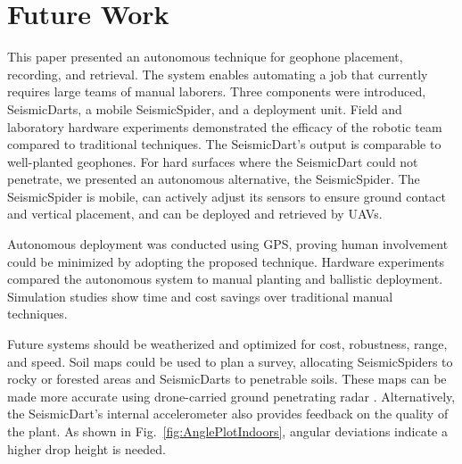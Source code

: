 \section[Conclusion]{Future Work}
This paper presented an autonomous technique for geophone placement, recording, and retrieval. The system enables automating a job that currently requires large teams of manual laborers. Three components were introduced, SeismicDarts, a mobile SeismicSpider, and a deployment unit.
Field and laboratory hardware experiments demonstrated the efficacy of the robotic team compared to traditional techniques. 
The SeismicDart's output is comparable to well-planted geophones. 
For hard surfaces where the SeismicDart could not penetrate, we presented an autonomous alternative, the SeismicSpider.  
The SeismicSpider is mobile, can actively adjust its sensors to ensure ground contact and vertical placement, and can be deployed and retrieved by UAVs.

Autonomous deployment was conducted using GPS, proving human involvement could be minimized by adopting the proposed technique. 
Hardware experiments compared the autonomous system to manual planting and ballistic deployment.
Simulation studies show time and cost savings over traditional manual techniques.

Future systems should be weatherized and optimized for cost, robustness, range, and speed. 
Soil maps could be used to plan a survey, allocating SeismicSpiders to rocky or forested areas and SeismicDarts to penetrable soils. 
These maps can be made more accurate using drone-carried ground penetrating radar \cite{merz2015new}. Alternatively, the  SeismicDart's internal accelerometer also provides feedback on the quality of the plant. As shown in Fig.~\ref{fig:AnglePlotIndoors}, angular deviations indicate a higher drop height is needed.  

